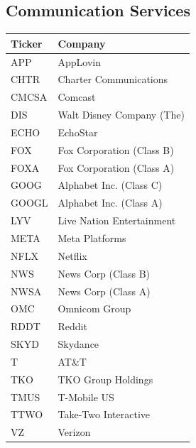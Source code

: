 \documentclass[11pt,a4paper]{article}
\begin{document}
\subsection{Communication Services}
\begin{table}[H]
\centering
\small
\begin{tabular}{lp{11cm}}
\hline
Ticker & Company \\
\hline
APP & AppLovin \\
CHTR & Charter Communications \\
CMCSA & Comcast \\
DIS & Walt Disney Company (The) \\
ECHO & EchoStar \\
FOX & Fox Corporation (Class B) \\
FOXA & Fox Corporation (Class A) \\
GOOG & Alphabet Inc. (Class C) \\
GOOGL & Alphabet Inc. (Class A) \\
LYV & Live Nation Entertainment \\
META & Meta Platforms \\
NFLX & Netflix \\
NWS & News Corp (Class B) \\
NWSA & News Corp (Class A) \\
OMC & Omnicom Group \\
RDDT & Reddit \\
SKYD & Skydance \\
T & AT\&T \\
TKO & TKO Group Holdings \\
TMUS & T-Mobile US \\
TTWO & Take-Two Interactive \\
VZ & Verizon \\
\hline
\end{tabular}
\end{table}
\end{document}
